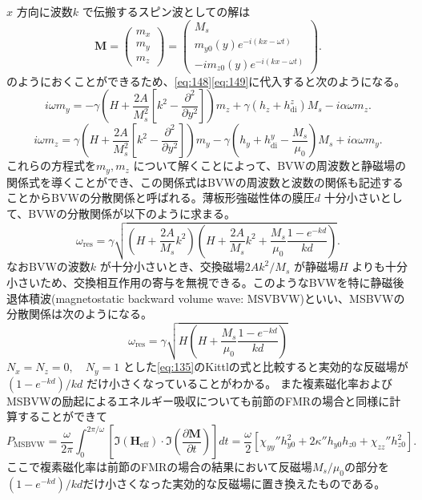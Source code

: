\documentclass[dvipdfmx]{jsreport}
\numberwithin{equation}{chapter}
\numberwithin{table}{chapter}
\begin{document}
$x$ 方向に波数$k$ で伝搬するスピン波としての解は
\begin{equation}
\label{eq:150}
	\bm{M}=\begin{pmatrix} m_x\\m_y\\m_z \end{pmatrix} =\begin{pmatrix} M_s\\m_{y 0}(y)e^{-i(kx-\omega t)}\\ -im_{z 0 }(y)e^{-i(kx-\omega t)} \end{pmatrix} 
.\end{equation}
のようにおくことができるため、\eqref{eq:148}\eqref{eq:149}に代入すると次のようになる。
\begin{equation}
\label{eq:151}
	i\omega m_y=-\gamma \left( H+\frac{2A}{M_s^2}\left[ k^2-\frac{\partial ^2}{\partial y^2}  \right]  \right) m_z+\gamma(h_z+h^{z}_\text{di} )M_s-i\alpha\omega m_z
.\end{equation}
\begin{equation}
\label{eq:152}
	i\omega m_z=\gamma\left( H+\frac{2A}{M_s^2}\left[ k^2-\frac{\partial ^2}{\partial y^2}  \right]  \right) m_y-\gamma\left( h_y+h^{y}_\text{di} -\frac{M_s}{\mu_0} \right) M_s+i\alpha\omega m_y
.\end{equation}
これらの方程式を$m_y,m_z$ について解くことによって、BVWの周波数と静磁場の関係式を導くことができ、この関係式はBVWの周波数と波数の関係も記述することからBVWの分散関係と呼ばれる。薄板形強磁性体の膜圧$d$ 十分小さいとして、BVWの分散関係が以下のように求まる\cite{ku}。
\begin{equation}
\label{eq:153}
	\omega_\text{res} =\gamma \sqrt{\left( H+\frac{2A}{M_s}k^2 \right) \left( H+\frac{2A}{M_s}k^2+\frac{M_s}{\mu_0}\frac{1-e^{-kd}}{kd} \right) } 
.\end{equation}
なおBVWの波数$k$ が十分小さいとき、交換磁場$2Ak^2 /M_s$ が静磁場$H$ よりも十分小さいため、交換相互作用の寄与を無視できる。このようなBVWを特に静磁後退体積波(magnetostatic backward volume wave: MSVBVW)といい、MSBVWの分散関係は次のようになる。
\begin{equation}
\label{eq:154}
	\omega_\text{res} =\gamma \sqrt{H\left( H+\frac{M_s}{\mu_0}\frac{1-e^{-kd}}{kd} \right) } 
\end{equation}
$N_x=N_z=0,\quad N_y=1$ とした\eqref{eq:135}のKittlの式と比較すると実効的な反磁場が$(1-e^{-kd })/kd$ だけ小さくなっていることがわかる。
また複素磁化率およびMSBVWの励起によるエネルギー吸収についても前節のFMRの場合と同様に計算することができて
\begin{equation}
\label{eq:155}
	P_\text{MSBVW} =\frac{\omega}{2\pi }\int_{0}^{2\pi /\omega} \left[ \Im(\bm{H}_\text{eff} )\cdot \Im\left( \frac{\partial \bm{M}}{\partial t}  \right)  \right]  dt=\frac{\omega}{2}\left[ \chi_{yy}'' h^2_{y0}+2\kappa'' h_{y 0}h_{z 0}+\chi_{zz}'' h^2_{z 0} \right] 
.\end{equation}
ここで複素磁化率は前節のFMRの場合の結果において反磁場$M_s /\mu_0$の部分を$(1-e^{-kd}) /kd$だけ小さくなった実効的な反磁場に置き換えたものである。
\end{document}
